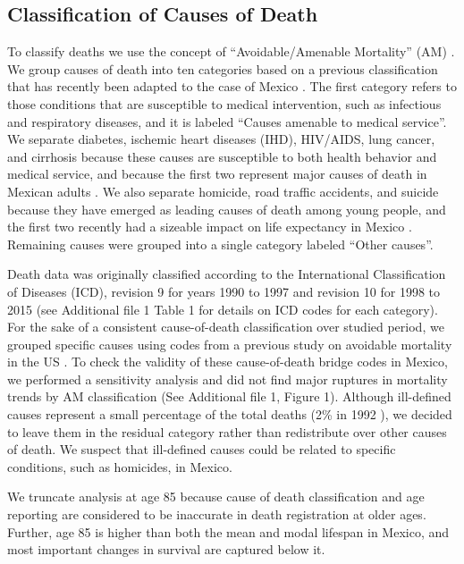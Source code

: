 \documentclass{bmcart}
\begin{document}
\subsection*{Classification of Causes of Death}
To classify deaths we use the concept of ``Avoidable/Amenable Mortality'' (AM) \cite{nolte&mckee2004, nolte&mckee2008}. We group causes of death into ten categories based on a previous classification  \cite{elo2014} that has recently been adapted to the case of Mexico \cite{Aburto2015}. The first category refers to those conditions that are susceptible to medical intervention, such as infectious and respiratory diseases, and it is labeled ``Causes amenable to medical service''. We separate diabetes, ischemic heart diseases (IHD), HIV/AIDS, lung
cancer, and cirrhosis because these causes are susceptible to both health behavior
and medical service, and because the first two represent major causes of death
in Mexican adults \cite{gomez2016dissonant}. We also separate
homicide, road traffic accidents, and suicide because they have emerged as
leading causes of death among young people, and the first two recently had a sizeable
impact on life expectancy in Mexico \cite{Aburto2015}. Remaining causes were grouped into a single category labeled ``Other causes''. 

Death data was originally classified according to the International Classification of Diseases (ICD), revision 9 for years 1990 to 1997 and revision 10 for 1998 to 2015 (see Additional file 1 Table 1 for details on ICD codes for each category). For the sake of a consistent cause-of-death classification over studied period, we grouped specific causes using codes from a previous study on avoidable mortality in the US \cite{elo2014}. To check the validity of these cause-of-death bridge codes in Mexico, we performed a sensitivity analysis and did not find major ruptures in mortality trends by AM classification (See Additional file 1, Figure 1). Although ill-defined causes represent a small percentage of the total deaths (2\% in 1992 \cite{rivera2002epidemiological}), we decided to leave them in the residual category rather than redistribute over other causes of death. We suspect that ill-defined causes could be related to specific conditions, such as homicides, in Mexico.

We truncate analysis at age 85 because cause of death classification and age reporting are considered to be inaccurate in death registration at older ages. Further, age 85 is higher than both the mean and modal lifespan in Mexico, and most important changes in survival are captured below it. 
\end{document}
